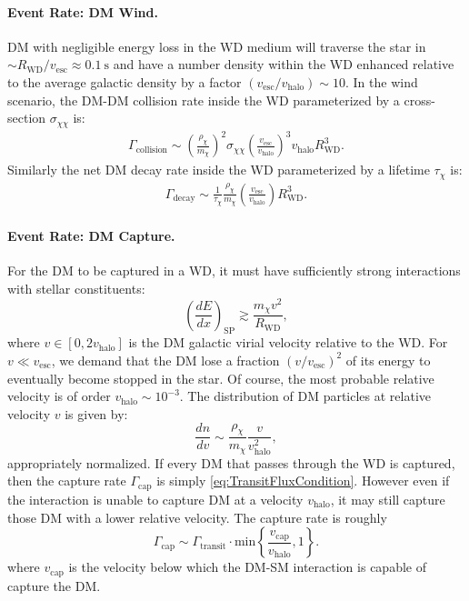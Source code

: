 \documentclass[preprintnumbers,amsmath,amssymb,prd,superscriptaddress]{revtex4}
\def\r{\right)}
\def\l{\left(}
\begin{document}
\paragraph{Event Rate: DM Wind.}
DM with negligible energy loss in the WD medium will traverse the star in $\sim R_\text{WD}/v_\text{esc} \approx 0.1 ~\text{s}$ and have a number density within the WD enhanced relative to the average galactic density by a factor $(v_\text{esc}/v_\text{halo}) \sim 10$.
In the wind scenario, the DM-DM collision rate inside the WD parameterized by a cross-section $\sigma_{\chi \chi}$ is:
\begin{align}
  \Gamma_\text{collision}
  \sim \l \frac{\rho_\chi}{m_\chi} \r^2 \sigma_{\chi \chi} \l \frac{v_\text{esc}}{v_\text{halo}}\r^3 v_\text{halo} R_\text{WD}^3.
  \label{eq:collisionDM}
\end{align}
Similarly the net DM decay rate inside the WD parameterized by a lifetime $\tau_\chi$ is:
\begin{align}
 \Gamma_\text{decay}
   \sim \frac{1}{\tau_\chi} \frac{\rho_{\chi}}{m_\chi} \l \frac{v_\text{esc}}{v_\text{halo}}\r R_\text{WD}^3.
  \label{eq:decayDM}
\end{align}

\paragraph{Event Rate: DM Capture.}
For the DM to be captured in a WD, it must have sufficiently strong interactions with stellar constituents:
\begin{equation}
\label{eq:capture}
\left( \frac{d E}{d x} \right)_\text{SP} \gtrsim \frac{m_\chi v^2}{R_\text{WD}},
\end{equation}
where $v \in [0, 2 v_\text{halo}]$ is the DM galactic virial velocity relative to the WD.  
For $v \ll v_\text{esc}$, we demand that the DM lose a fraction $(v/v_\text{esc})^2$ of its energy to eventually become stopped in the star. 
Of course, the most probable relative velocity is of order $v_\text{halo} \sim 10^{-3}$.
The distribution of DM particles at relative velocity $v$ is given by:
\begin{equation}
\frac{dn}{dv} \sim \frac{\rho_\chi}{m_\chi} \frac{v}{v_\text{halo}^2},
\end{equation}
appropriately normalized. 
If every DM that passes through the WD is captured, then the capture rate $\Gamma_\text{cap}$ is simply \eqref{eq:TransitFluxCondition}. 
However even if the interaction is unable to capture DM at a velocity $v_\text{halo}$, it may still capture those DM with a lower relative velocity.
The capture rate is roughly
\begin{equation}
\Gamma_\text{cap} \sim \Gamma_\text{transit} \cdot \text{min} \left \{ \frac{v_\text{cap}}{v_\text{halo}}, 1\right \}. 
\end{equation}
where $v_\text{cap}$ is the velocity below which the DM-SM interaction is capable of capture the DM. 
\end{document}
